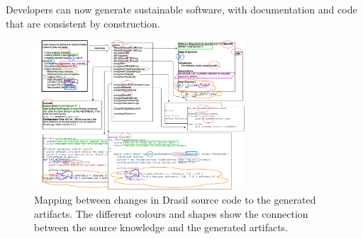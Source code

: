 \documentclass[onecolumn]{IEEEtran}
\begin{document}
\begin{multicols}{2}
Developers can now generate sustainable software, with documentation and code
that are consistent by construction.


  
\end{multicols}

\begin{figure}[h!]
\centering
\includegraphics[width=0.7\textwidth]{DrasilSupportsChange.png}
\caption{Mapping between changes in Drasil source code to the generated
  artifacts.  The different colours and shapes show the connection between the
  source knowledge and the generated artifacts.}
\label{Fig_DrasilAndChange}
\end{figure}
\end{document}
